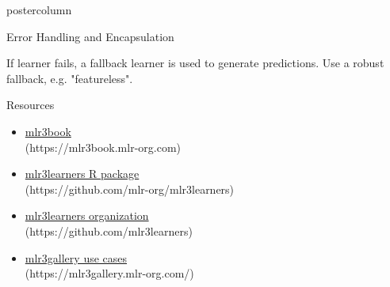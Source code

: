 \documentclass{beamer}
\begin{document}
\begin{withoutheader}
\begin{frame}[fragile]{}
\begin{columns}
\begin{column}{.245\textwidth}
\begin{beamercolorbox}[center]{postercolumn}
\begin{minipage}{.98\textwidth}
{\begin{myblock}{Error Handling and Encapsulation}
\begin{codebox}
								\end{codebox}
								If learner fails, a fallback learner is used to generate predictions.
								Use a robust fallback, e.g. "featureless".
							\end{myblock}
							\begin{myblock}{Resources}
								\begin{itemize}
									\item \href{https://mlr3book.mlr-org.com/index.html}{mlr3book}\\ (https://mlr3book.mlr-org.com)
									\item \href{https://github.com/mlr-org/mlr3learners}{mlr3learners R package}\\ (https://github.com/mlr-org/mlr3learners)
									\item \href{https://github.com/mlr3learners}{mlr3learners organization}\\ (https://github.com/mlr3learners)
									\item \href{https://mlr3gallery.mlr-org.com/}{mlr3gallery use cases}\\ (https://mlr3gallery.mlr-org.com/)
								\end{itemize}
							\end{myblock}
							\vfill}
					\end{minipage}
				\end{beamercolorbox}
			\end{column}
		\end{columns}
	\end{frame}
\end{withoutheader}
\end{document}
